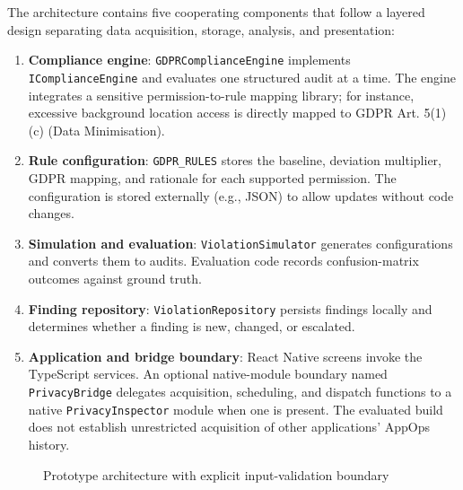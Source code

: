 The architecture contains five cooperating components that follow a layered design separating data acquisition, storage, analysis, and presentation:

\begin{enumerate}
\item \textbf{Compliance engine}: \texttt{GDPRComplianceEngine} implements \texttt{IComplianceEngine} and evaluates one structured audit at a time. The engine integrates a sensitive permission-to-rule mapping library; for instance, excessive background location access is directly mapped to GDPR Art. 5(1)(c) (Data Minimisation).
\item \textbf{Rule configuration}: \texttt{GDPR\_RULES} stores the baseline, deviation multiplier, GDPR mapping, and rationale for each supported permission. The configuration is stored externally (e.g., JSON) to allow updates without code changes.
\item \textbf{Simulation and evaluation}: \texttt{ViolationSimulator} generates configurations and converts them to audits. Evaluation code records confusion-matrix outcomes against ground truth.
\item \textbf{Finding repository}: \texttt{ViolationRepository} persists findings locally and determines whether a finding is new, changed, or escalated.
\item \textbf{Application and bridge boundary}: React Native screens invoke the TypeScript services. An optional native-module boundary named \texttt{PrivacyBridge} delegates acquisition, scheduling, and dispatch functions to a native \texttt{PrivacyInspector} module when one is present. The evaluated build does not establish unrestricted acquisition of other applications' AppOps history.
\end{enumerate}

\begin{figure}[H]
\centering
{}
\caption{Prototype architecture with explicit input-validation boundary}
\label{fig:final-architecture}
\end{figure}

